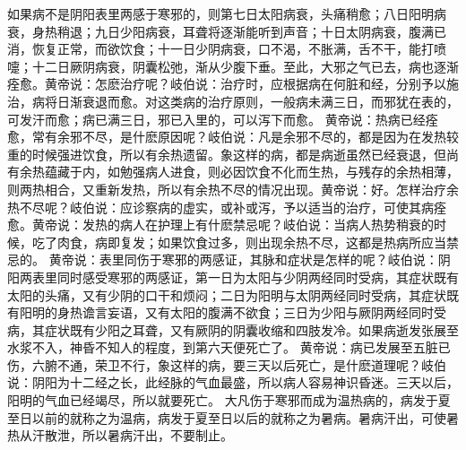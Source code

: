 \documentclass[a4paper,12pt,UTF8,twoside]{ctexbook}
\begin{document}
如果病不是阴阳表里两感于寒邪的，则第七日太阳病衰，头痛稍愈；八日阳明病衰，身热稍退；九日少阳病衰，耳聋将逐渐能听到声音；十日太阴病衰，腹满已消，恢复正常，而欲饮食；十一日少阴病衰，口不渴，不胀满，舌不干，能打喷嚏；十二日厥阴病衰，阴囊松弛，渐从少腹下垂。至此，大邪之气已去，病也逐渐痊愈。黄帝说：怎麽治疗呢？岐伯说：治疗时，应根据病在何脏和经，分别予以施治，病将日渐衰退而愈。对这类病的治疗原则，一般病未满三日，而邪犹在表的，可发汗而愈；病已满三日，邪已入里的，可以泻下而愈。
黄帝说：热病已经痊愈，常有余邪不尽，是什麽原因呢？岐伯说：凡是余邪不尽的，都是因为在发热较重的时候强进饮食，所以有余热遗留。象这样的病，都是病逝虽然已经衰退，但尚有余热蕴藏于内，如勉强病人进食，则必因饮食不化而生热，与残存的余热相薄，则两热相合，又重新发热，所以有余热不尽的情况出现。黄帝说：好。怎样治疗余热不尽呢？岐伯说：应诊察病的虚实，或补或泻，予以适当的治疗，可使其病痊愈。黄帝说：发热的病人在护理上有什麽禁忌呢？岐伯说：当病人热势稍衰的时候，吃了肉食，病即复发；如果饮食过多，则出现余热不尽，这都是热病所应当禁忌的。
黄帝说：表里同伤于寒邪的两感证，其脉和症状是怎样的呢？岐伯说：阴阳两表里同时感受寒邪的两感证，第一日为太阳与少阴两经同时受病，其症状既有太阳的头痛，又有少阴的口干和烦闷；二日为阳明与太阴两经同时受病，其症状既有阳明的身热谵言妄语，又有太阳的腹满不欲食；三日为少阳与厥阴两经同时受病，其症状既有少阳之耳聋，又有厥阴的阴囊收缩和四肢发冷。如果病逝发张展至水浆不入，神昏不知人的程度，到第六天便死亡了。
黄帝说：病已发展至五脏已伤，六腑不通，荣卫不行，象这样的病，要三天以后死亡，是什麽道理呢？岐伯说：阴阳为十二经之长，此经脉的气血最盛，所以病人容易神识昏迷。三天以后，阳明的气血已经竭尽，所以就要死亡。
大凡伤于寒邪而成为温热病的，病发于夏至日以前的就称之为温病，病发于夏至日以后的就称之为暑病。暑病汗出，可使暑热从汗散泄，所以暑病汗出，不要制止。
\end{document}
